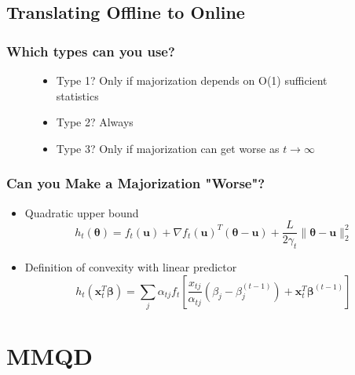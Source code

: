 \documentclass{beamer}
\newcommand{\iter}[2]{#1^{(#2)}}
\begin{document}
\subsection{Translating Offline to Online}
\begin{frame}
  \frametitle{Which types can you use?}
  \begin{figure}
    \begin{itemize}
      \item Type 1? Only if majorization depends on O(1) sufficient statistics
      \item Type 2? Always
      \item Type 3? Only if majorization can get worse as $t\rightarrow\infty$
    \end{itemize}
  \end{figure}
\end{frame}
\begin{frame}
  \frametitle{Can you Make a Majorization "Worse"?}
  \begin{itemize}
    \item[\ding{51}] Quadratic upper bound
      $$h_t(\bm\theta) = f_t(\bm u) + \nabla f_t(\bm u)^T(\bm\theta - \bm u) + \frac{L}{2\gamma_t}\|\bm\theta - \bm u\|_2^2$$
    \item[\ding{55}] Definition of convexity with linear predictor
      $$h_t(\bm x_t^T\bm\beta) = \sum_j \alpha_{tj} f_t\left[\frac{x_{tj}}{\alpha_{tj}}(\beta_j - \iter{\beta_j}{t-1}) + \bm x_t^T\iter{\bm\beta}{t-1}\right]$$
  \end{itemize}
\end{frame}


\section{MMQD}
\end{document}
